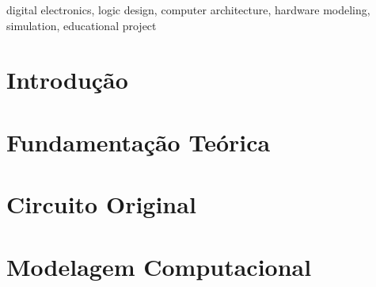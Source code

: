 \documentclass[conference]{IEEEtran}
\begin{document}
\begin{IEEEkeywords}
digital electronics, logic design, computer architecture, hardware modeling, simulation, educational project
\end{IEEEkeywords}


\section{Introdução}

\section{Fundamentação Teórica}



\section{Circuito Original}



\section{Modelagem Computacional}
\end{document}
